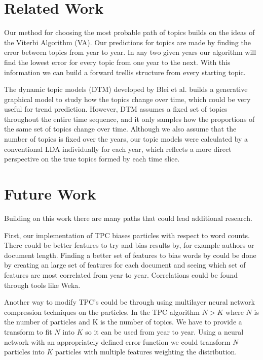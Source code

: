 \documentclass[conference]{IEEEtran}
\begin{document}
\section{Related Work}
Our method for choosing the most probable path of topics builds on the ideas of the Viterbi Algorithm (VA)\cite{viterbi}. Our predictions for topics are made by finding the error between topics from year to year. In any two given years our algorithm will find the lowest error for every topic from one year to the next. With this information we can build a forward trellis structure from every starting topic.

The dynamic topic models (DTM) developed by Blei et al. \cite{blei2006} builds a generative graphical model to study how the topics change over time, which could be very useful for trend prediction. However, DTM assumes a fixed set of topics throughout the entire time sequence, and it only samples how the proportions of the same set of topics change over time. Although we also assume that the number of topics is fixed over the years, our topic models were calculated by a conventional LDA individually for each year, which reflects a more direct perspective on the true topics formed by each time slice.

\section{Future Work}
Building on this work there are many paths that could lead additional research.

First, our implementation of TPC biases particles with respect to word counts. There could be better features to try and bias results by, for example authors or document length. Finding a better set of features to bias words by could be done by creating an large set of features for each document and seeing which set of features are most correlated from year to year. Correlations could be found through tools like Weka. 

Another way to modify TPC's could be through using multilayer neural network compression techniques on the particles. In the TPC algorithm $N>K$ where $N$ is the number of particles and K is the number of topics. We have to provide a transform to fit $N$ into $K$ so it can be used from year to year. Using a neural network with an appropriately defined error function we could transform $N$ particles into $K$ particles with multiple features weighting the distribution.
\end{document}
